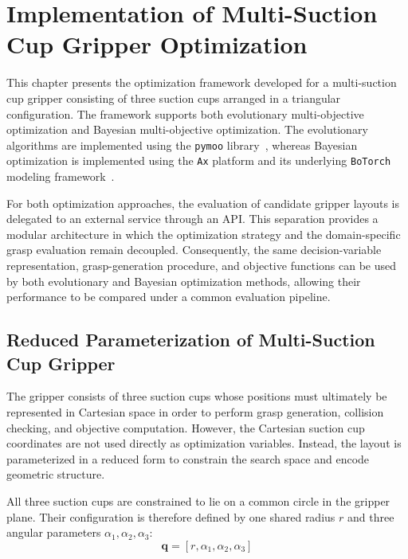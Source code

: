 
\section{Implementation of Multi-Suction Cup Gripper Optimization}

This chapter presents the optimization framework developed for a multi-suction cup gripper
consisting of three suction cups arranged in a triangular configuration. The framework supports both
evolutionary multi-objective optimization and Bayesian multi-objective optimization. The
evolutionary algorithms are implemented using the \texttt{pymoo} library~\cite{pymoo}, whereas
Bayesian optimization is implemented using the \texttt{Ax} platform and its underlying
\texttt{BoTorch} modeling framework~\cite{olson2025ax,botorch}.

For both optimization approaches, the evaluation of candidate gripper layouts is delegated to an
external service through an API. This separation provides a modular architecture in which the
optimization strategy and the domain-specific grasp evaluation remain decoupled. Consequently, the
same decision-variable representation, grasp-generation procedure, and objective functions can be
used by both evolutionary and Bayesian optimization methods, allowing their performance to be
compared under a common evaluation pipeline.

\subsection{Reduced Parameterization of Multi-Suction Cup Gripper}

The gripper consists of three suction cups whose positions must ultimately be represented in
Cartesian space in order to perform grasp generation, collision checking, and objective computation.
However, the Cartesian suction cup coordinates are not used directly as optimization variables.
Instead, the layout is parameterized in a reduced form to constrain the search space and encode
geometric structure.

All three suction cups are constrained to lie on a common circle in the gripper plane. Their
configuration is therefore defined by one shared radius $r$ and three angular parameters
$\alpha_1,\alpha_2,\alpha_3$:
\begin{equation}
    \mathbf{q} = [r,\alpha_1,\alpha_2,\alpha_3]
\end{equation}

